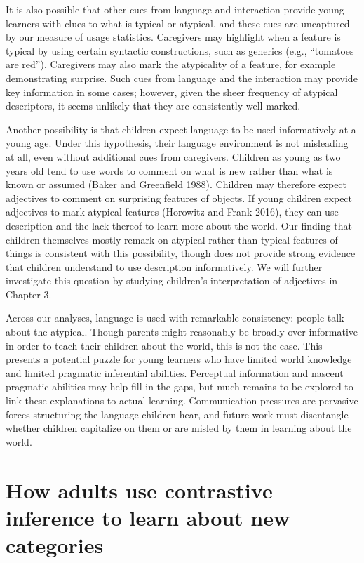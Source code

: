 \documentclass{ucetd}
\begin{document}
It is also possible that other cues from language and interaction
provide young learners with clues to what is typical or atypical, and
these cues are uncaptured by our measure of usage statistics. Caregivers
may highlight when a feature is typical by using certain syntactic
constructions, such as generics (e.g., ``tomatoes are red''). Caregivers
may also mark the atypicality of a feature, for example demonstrating
surprise. Such cues from language and the interaction may provide key
information in some cases; however, given the sheer frequency of
atypical descriptors, it seems unlikely that they are consistently
well-marked.

Another possibility is that children expect language to be used
informatively at a young age. Under this hypothesis, their language
environment is not misleading at all, even without additional cues from
caregivers. Children as young as two years old tend to use words to
comment on what is new rather than what is known or assumed (Baker and
Greenfield 1988). Children may therefore expect adjectives to comment on
surprising features of objects. If young children expect adjectives to
mark atypical features (Horowitz and Frank 2016), they can use
description and the lack thereof to learn more about the world. Our
finding that children themselves mostly remark on atypical rather than
typical features of things is consistent with this possibility, though
does not provide strong evidence that children understand to use
description informatively. We will further investigate this question by
studying children's interpretation of adjectives in Chapter 3.

Across our analyses, language is used with remarkable consistency:
people talk about the atypical. Though parents might reasonably be
broadly over-informative in order to teach their children about the
world, this is not the case. This presents a potential puzzle for young
learners who have limited world knowledge and limited pragmatic
inferential abilities. Perceptual information and nascent pragmatic
abilities may help fill in the gaps, but much remains to be explored to
link these explanations to actual learning. Communication pressures are
pervasive forces structuring the language children hear, and future work
must disentangle whether children capitalize on them or are misled by
them in learning about the world.

\hypertarget{how-adults-use-contrastive-inference-to-learn-about-new-categories}{%
\chapter{How adults use contrastive inference to learn about new
categories}\label{how-adults-use-contrastive-inference-to-learn-about-new-categories}}
\end{document}
